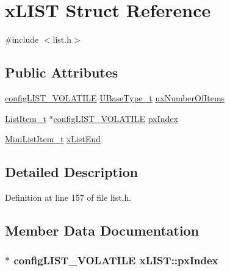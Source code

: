 \hypertarget{structx_l_i_s_t}{}\section{x\+L\+I\+ST Struct Reference}
\label{structx_l_i_s_t}


{\ttfamily \#include $<$list.\+h$>$}

\subsection*{Public Attributes}
\begin{DoxyCompactItemize}
\item 
\hyperlink{list_8h_a2d5de557c5561c8980d1bf51d87d8cba}{config\+L\+I\+S\+T\+\_\+\+V\+O\+L\+A\+T\+I\+LE} \hyperlink{_g_c_c_2_a_r_m___c_m3_2portmacro_8h_a646f89d4298e4f5afd522202b11cb2e6}{U\+Base\+Type\+\_\+t} \hyperlink{structx_l_i_s_t_a84575245383c081395f3f49fe0356e33}{ux\+Number\+Of\+Items}
\item 
\hyperlink{list_8h_a1a62d469392f9bfe2443e7efab9c8398}{List\+Item\+\_\+t} $\ast$\hyperlink{list_8h_a2d5de557c5561c8980d1bf51d87d8cba}{config\+L\+I\+S\+T\+\_\+\+V\+O\+L\+A\+T\+I\+LE} \hyperlink{structx_l_i_s_t_a7bf64d87701493b4c8c5c977682500d7}{px\+Index}
\item 
\hyperlink{list_8h_a542a8d55e98bc407593979e61f83cd02}{Mini\+List\+Item\+\_\+t} \hyperlink{structx_l_i_s_t_a49ad62fa153126e27e273811167b336a}{x\+List\+End}
\end{DoxyCompactItemize}


\subsection{Detailed Description}


Definition at line 157 of file list.\+h.



\subsection{Member Data Documentation}
\subsubsection[{\texorpdfstring{px\+Index}{pxIndex}}]{$\ast$ {\bf config\+L\+I\+S\+T\+\_\+\+V\+O\+L\+A\+T\+I\+LE} x\+L\+I\+S\+T\+::px\+Index}\hypertarget{structx_l_i_s_t_a7bf64d87701493b4c8c5c977682500d7}{}\label{structx_l_i_s_t_a7bf64d87701493b4c8c5c977682500d7}



